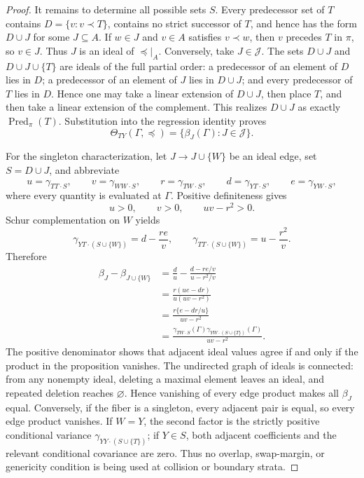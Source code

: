 \documentclass{article}
\begin{document}
\begin{proof}
It remains to determine all possible sets \(S\).  Every predecessor set of \(T\) contains
\(D=\{v:v\prec T\}\), contains no strict successor of \(T\), and hence has the form \(D\cup J\) for some \(J\subseteq A\).  If \(w\in J\) and \(v\in A\) satisfies \(v\prec w\), then \(v\) precedes \(T\) in \(\pi\), so \(v\in J\).  Thus \(J\) is an ideal of \(\preceq|_A\).  Conversely, take \(J\in\mathcal J\).  The sets \(D\cup J\) and \(D\cup J\cup\{T\}\) are ideals of the full partial order: a predecessor of an element of \(D\) lies in \(D\); a predecessor of an element of \(J\) lies in \(D\cup J\); and every predecessor of \(T\) lies in \(D\).  Hence one may take a linear extension of \(D\cup J\), then place \(T\), and then take a linear extension of the complement.  This realizes \(D\cup J\) as exactly \(\operatorname{Pred}_{\pi}(T)\).  Substitution into the regression identity proves
\[
 \Theta_{TY}(\Gamma,\preceq)
 =\{\beta_J(\Gamma):J\in\mathcal J\}.
\]

For the singleton characterization, let \(J\to J\cup\{W\}\) be an ideal edge, set \(S=D\cup J\), and abbreviate
\[
 u=\gamma_{TT\cdot S},\qquad
 v=\gamma_{WW\cdot S},\qquad
 r=\gamma_{TW\cdot S},\qquad
 d=\gamma_{YT\cdot S},\qquad
 e=\gamma_{YW\cdot S},
\]
where every quantity is evaluated at \(\Gamma\).  Positive definiteness gives
\[
 u>0,\qquad v>0,\qquad uv-r^2>0.
\]
Schur complementation on \(W\) yields
\[
 \gamma_{YT\cdot(S\cup\{W\})}=d-\frac{re}{v},
 \qquad
 \gamma_{TT\cdot(S\cup\{W\})}=u-\frac{r^2}{v}.
\]
Therefore
\[
 \begin{aligned}
 \beta_J-\beta_{J\cup\{W\}}
 &=\frac d u-\frac{d-re/v}{u-r^2/v}\\
 &=\frac{r(ue-dr)}{u(uv-r^2)}\\
 &=\frac{r\{e-dr/u\}}{uv-r^2}\\
 &=\frac{\gamma_{TW\cdot S}(\Gamma)
          \gamma_{YW\cdot(S\cup\{T\})}(\Gamma)}
         {uv-r^2}.
 \end{aligned}
\]
The positive denominator shows that adjacent ideal values agree if and only if the product in the proposition vanishes.  The undirected graph of ideals is connected: from any nonempty ideal, deleting a maximal element leaves an ideal, and repeated deletion reaches \(\varnothing\).  Hence vanishing of every edge product makes all \(\beta_J\) equal.  Conversely, if the fiber is a singleton, every adjacent pair is equal, so every edge product vanishes.  If \(W=Y\), the second factor is the strictly positive conditional variance \(\gamma_{YY\cdot(S\cup\{T\})}\); if \(Y\in S\), both adjacent coefficients and the relevant conditional covariance are zero.  Thus no overlap, swap-margin, or genericity condition is being used at collision or boundary strata.
\end{proof}
\end{document}
